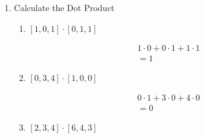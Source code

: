 \documentclass{article}
\begin{document}
\begin{enumerate}
\begin{enumerate}
\begin{mdframed}
                    \end{mdframed}
                \item $[0, 3, 4] \times [2, 2, 2]$
                    \begin{mdframed}
                        \begin{gather}
                            \det{
                                \begin{bmatrix}
                                    i & j & k\\ 
                                    0 & 3 & 4\\
                                    2 & 2 & 2
                                \end{bmatrix}
                            } = \\
                            i(3)(2) + j(4)(2) + k(0)(2)
                            - i(4)(2) - j(0)(2) - k(3)(2)\\
                            = 6i + 8j - 8i - 6k\\
                            = -2i + 8j -6k = [-2, 8, -6]
                        \end{gather}
                    \end{mdframed}
            \end{enumerate}
            \break
        \item Calculate the Dot Product
            \begin{enumerate}
                \item $[1, 0, 1] \cdot [0, 1, 1]$
                    \begin{mdframed}
                        \begin{gather}
                            1 \cdot 0 + 0 \cdot 1 + 1 \cdot 1\\
                            = 1
                        \end{gather}
                    \end{mdframed}
                \item $[0, 3, 4] \cdot [1, 0, 0]$
                    \begin{mdframed}
                        \begin{gather}
                            0 \cdot 1 + 3 \cdot 0 + 4 \cdot 0\\
                            = 0
                        \end{gather}
                    \end{mdframed}
                \item $[2, 3, 4] \cdot [6, 4, 3]$

\end{enumerate}
\end{enumerate}
\end{document}
